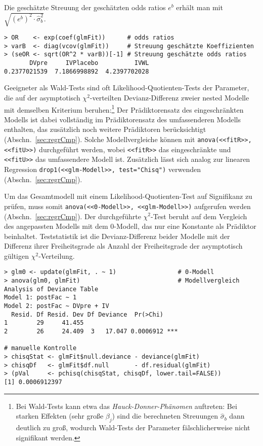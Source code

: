 Die geschätzte Streuung der geschätzten odds ratios $e^{b}$ erhält man mit $\sqrt{\left(e^{b}\right)^{2} \cdot \hat{\sigma}^{2}_{b}}$.
\begin{lstlisting}
> OR    <- exp(coef(glmFit))      # odds ratios
> varB  <- diag(vcov(glmFit))     # Streuung geschätzte Koeffizienten
> (seOR <- sqrt(OR^2 * varB))[-1] # Streuung geschätzte odds ratios
       DVpre     IVPlacebo          IVWL
0.2377021539  7.1866998892  4.2397702028
\end{lstlisting}

Geeigneter als Wald-Tests sind oft Likelihood-Quotienten-Tests der Parameter, die auf der asymptotisch $\chi^{2}$-verteilten Devianz-Differenz zweier nested Modelle mit demselben Kriterium beruhen:\footnote{\label{ftn:HauckDonner}Bei Wald-Tests kann etwa das \emph{Hauck-Donner-Phänomen} auftreten: Bei starken Effekten (sehr große $\beta_{j}$) sind die berechneten Streuungen $\hat{\sigma}_{b}$ dann deutlich zu groß, wodurch Wald-Tests der Parameter fälschlicherweise nicht signifikant werden.} Der Prädiktorensatz des eingeschränkten Modells ist dabei vollständig im Prädiktorensatz des umfassenderen Modells enthalten, das zusätzlich noch weitere Prädiktoren berücksichtigt (Abschn.\ \ref{sec:regrCmp}). Solche Modellvergleiche können mit \lstinline!anova(<<fitR>>, <<fitU>>)! durchgeführt werden, wobei \lstinline!<<fitR>>! das eingeschränkte und \lstinline!<<fitU>>! das umfassendere Modell ist. Zusätzlich lässt sich analog zur linearen Regression \lstinline!drop1(<<glm-Modell>>, test="Chisq")! verwenden (Abschn.\ \ref{sec:regrCmp}).

Um das Gesamtmodell mit einem Likelihood-Quotienten-Test auf Signifikanz zu prüfen, muss somit \lstinline!anova(<<0-Modell>>, <<glm-Modell>>)! aufgerufen werden (Abschn.\ \ref{sec:regrCmp}). Der durchgeführte $\chi^{2}$-Test beruht auf dem Vergleich des angepassten Modells mit dem $0$-Modell, das nur eine Konstante als Prädiktor beinhaltet. Teststatistik ist die Devianz-Differenz beider Modelle mit der Differenz ihrer Freiheitsgrade als Anzahl der Freiheitsgrade der asymptotisch gültigen $\chi^{2}$-Verteilung.
\begin{lstlisting}
> glm0 <- update(glmFit, . ~ 1)                 # 0-Modell
> anova(glm0, glmFit)                           # Modellvergleich
Analysis of Deviance Table
Model 1: postFac ~ 1
Model 2: postFac ~ DVpre + IV
  Resid. Df Resid. Dev Df Deviance  Pr(>Chi)
1        29     41.455
2        26     24.409  3   17.047 0.0006912 ***

# manuelle Kontrolle
> chisqStat <- glmFit$null.deviance - deviance(glmFit)
> chisqDf   <- glmFit$df.null       - df.residual(glmFit)
> (pVal     <- pchisq(chisqStat, chisqDf, lower.tail=FALSE))
[1] 0.0006912397
\end{lstlisting}

